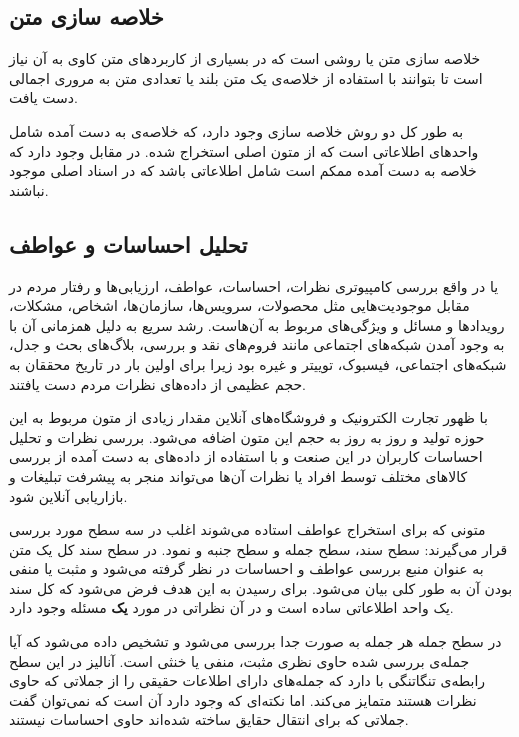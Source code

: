 \documentclass[12pt, a4paper, oneside]{report}
\begin{document}
\subsection{خلاصه سازی متن}

خلاصه سازی متن یا
روشی است که در بسیاری از کاربرد‌های متن کاوی به آن نیاز است تا بتوانند با استفاده از خلاصه‌ی یک متن بلند
یا تعدادی متن به مروری اجمالی دست یافت.

به طور کل دو روش خلاصه سازی وجود دارد،
که خلاصه‌ی به دست آمده شامل واحد‌های اطلاعاتی است که از متون اصلی استخراج شده. در مقابل
وجود دارد که خلاصه به دست آمده ممکم است شامل اطلاعاتی باشد که در اسناد اصلی موجود نباشند\cite{DBLP:journals/corr/AllahyariPASTGK17a}.

\subsection{تحلیل احساسات و عواطف}

یا
در واقع بررسی کامپیوتری نظرات، احساسات، عواطف، ارزیابی‌ها و رفتار مردم در مقابل موجودیت‌هایی
مثل محصولات، سرویس‌ها، سازمان‌ها، اشخاص، مشکلات، رویدادها و مسائل و ویژگی‌های مربوط به آن‌هاست.
رشد سریع
به دلیل همزمانی آن با به وجود آمدن شبکه‌های اجتماعی مانند فروم‌های نقد و بررسی، بلاگ‌های بحث و جدل،
شبکه‌های اجتماعی، فیسبوک، توییتر و غیره بود زیرا برای اولین بار در تاریخ محققان به حجم عظیمی
از داده‌های نظرات مردم دست یافتند.
\cite{zhang2018deep}

با ظهور تجارت الکترونیک و فروشگاه‌های آنلاین مقدار زیادی از متون مربوط به این حوزه تولید و روز به روز
به حجم این متون اضافه می‌شود. بررسی نظرات و تحلیل احساسات کاربران در این صنعت و با استفاده از داده‌های به دست
آمده از بررسی کالاهای مختلف توسط افراد یا نظرات آن‌ها می‌تواند منجر به پیشرفت تبلیغات و بازاریابی آنلاین شود\cite{DBLP:journals/corr/AllahyariPASTGK17a}.

متونی که برای استخراج عواطف استاده می‌شوند اغلب در سه سطح مورد بررسی قرار می‌گیرند: سطح سند، سطح جمله و سطح جنبه و نمود.
در سطح سند کل یک متن به عنوان منبع بررسی عواطف و احساسات در نظر گرفته می‌شود و مثبت یا منفی بودن آن
به طور کلی بیان می‌شود. برای رسیدن به این هدف فرض می‌شود که کل سند یک واحد اطلاعاتی ساده است و در آن
نظراتی در مورد
\textbf{یک}
مسئله وجود دارد.
\cite{zhang2018deep}

در سطح جمله هر جمله به صورت جدا بررسی می‌شود و تشخیص داده می‌شود که آیا جمله‌ی بررسی شده حاوی نظری مثبت، منفی
یا خنثی است. آنالیز در این سطح رابطه‌ی تنگاتنگی با
دارد که جمله‌های دارای اطلاعات حقیقی را از جملاتی که حاوی نظرات هستند متمایز می‌کند. اما نکته‌ای که وجود دارد آن است که
نمی‌توان گفت جملاتی که برای انتقال حقایق ساخته شده‌اند حاوی احساسات نیستند.
\cite{zhang2018deep}
\end{document}

